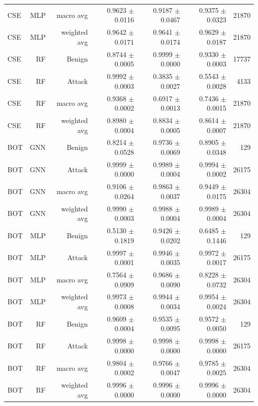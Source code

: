 \begin{tabular}{lrrrrrr}
CSE & MLP & macro avg & 0.9623 $\pm$ 0.0116 & 0.9187 $\pm$ 0.0467 & 0.9375 $\pm$ 0.0323 & 21870 \\
CSE & MLP & weighted avg & 0.9642 $\pm$ 0.0171 & 0.9641 $\pm$ 0.0174 & 0.9629 $\pm$ 0.0187 & 21870 \\
CSE & RF & Benign & 0.8744 $\pm$ 0.0005 & 0.9999 $\pm$ 0.0000 & 0.9330 $\pm$ 0.0003 & 17737 \\
CSE & RF & Attack & 0.9992 $\pm$ 0.0003 & 0.3835 $\pm$ 0.0027 & 0.5543 $\pm$ 0.0028 & 4133 \\
CSE & RF & macro avg & 0.9368 $\pm$ 0.0002 & 0.6917 $\pm$ 0.0013 & 0.7436 $\pm$ 0.0015 & 21870 \\
CSE & RF & weighted avg & 0.8980 $\pm$ 0.0004 & 0.8834 $\pm$ 0.0005 & 0.8614 $\pm$ 0.0007 & 21870 \\
BOT & GNN & Benign & 0.8214 $\pm$ 0.0528 & 0.9736 $\pm$ 0.0069 & 0.8905 $\pm$ 0.0348 & 129 \\
BOT & GNN & Attack & 0.9999 $\pm$ 0.0000 & 0.9989 $\pm$ 0.0004 & 0.9994 $\pm$ 0.0002 & 26175 \\
BOT & GNN & macro avg & 0.9106 $\pm$ 0.0264 & 0.9863 $\pm$ 0.0037 & 0.9449 $\pm$ 0.0175 & 26304 \\
BOT & GNN & weighted avg & 0.9990 $\pm$ 0.0003 & 0.9988 $\pm$ 0.0004 & 0.9989 $\pm$ 0.0004 & 26304 \\
BOT & MLP & Benign & 0.5130 $\pm$ 0.1819 & 0.9426 $\pm$ 0.0202 & 0.6485 $\pm$ 0.1446 & 129 \\
BOT & MLP & Attack & 0.9997 $\pm$ 0.0001 & 0.9946 $\pm$ 0.0035 & 0.9972 $\pm$ 0.0017 & 26175 \\
BOT & MLP & macro avg & 0.7564 $\pm$ 0.0909 & 0.9686 $\pm$ 0.0090 & 0.8228 $\pm$ 0.0732 & 26304 \\
BOT & MLP & weighted avg & 0.9973 $\pm$ 0.0008 & 0.9944 $\pm$ 0.0034 & 0.9954 $\pm$ 0.0024 & 26304 \\
BOT & RF & Benign & 0.9609 $\pm$ 0.0004 & 0.9535 $\pm$ 0.0095 & 0.9572 $\pm$ 0.0050 & 129 \\
BOT & RF & Attack & 0.9998 $\pm$ 0.0000 & 0.9998 $\pm$ 0.0000 & 0.9998 $\pm$ 0.0000 & 26175 \\
BOT & RF & macro avg & 0.9804 $\pm$ 0.0002 & 0.9766 $\pm$ 0.0047 & 0.9785 $\pm$ 0.0025 & 26304 \\
BOT & RF & weighted avg & 0.9996 $\pm$ 0.0000 & 0.9996 $\pm$ 0.0000 & 0.9996 $\pm$ 0.0000 & 26304 \\
\bottomrule
\end{tabular}

